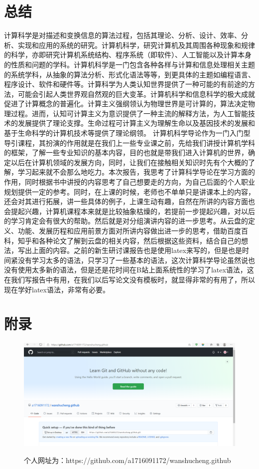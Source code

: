 \documentclass{article}
\begin{document}
\section{总结}
计算科学是对描述和变换信息的算法过程，包括其理论、分析、设计、效率、分析、实现和应用的系统的研究。计算机科学，研究计算机及其周围各种现象和规律的科学，亦即研究计算机系统结构、程序系统（即软件）、人工智能以及计算本身的性质和问题的学科。计算机科学是一门包含各种各样与计算和信息处理相关主题的系统学科，从抽象的算法分析、形式化语法等等，到更具体的主题如编程语言、程序设计、软件和硬件等。计算科学为人类认知世界提供了一种可能的有前途的方法，可能会引起人类世界观自然观的巨大变革。计算机科学和信息科学的极大成就促进了计算概念的普遍化。计算主义强纲领认为物理世界是可计算的，算法决定物理过程。进而，认知可计算主义为意识提供了一种主流的解释方法，为人工智能技术的发展提供了理论支撑。生命过程可计算主义为理解生命以及基因技术的发展和基于生命科学的计算机技术等提供了理论纲领。
计算机科学导论作为一门入门型导引课程，其扮演的作用就是在我们上一些专业课之前，先给我们讲授计算机学科的框架，了解一些专业知识的基本内容，目的也就是带我们进入计算机的世界，确定以后在计算机领域的发展方向，同时，让我们在接触相关知识时先有个大概的了解，学习起来就不会那么地吃力。本次报告，我思考了计算科学导论在学习方面的作用，同时根据书中讲授的内容思考了自己想要走的方向，为自己后面的个人职业规划提供一定的参考。同时，在上课的时候，老师也不单单只是讲课本上的内容，还会对其进行拓展，讲一些具体的例子，上课生动有趣，自然在所讲的内容方面也会提起兴趣，计算机课程本来就是比较抽象枯燥的，若提前一步提起兴趣，对以后的学习肯定会有很大的帮助。然后就是对分组演讲内容的进一步思考。从云盘的定义、功能、发展历程和应用前景方面对所讲内容做出进一步的思考，借助百度百科，知乎和各种论文了解到云盘的相关内容，然后根据这些资料，结合自己的想法，写出上面的内容。之前的新生研讨课报告也是使用latex来写的，但是也是时间紧没有学习太多的语法，只学习了一些基本的语法，这次计算科学导论虽然说也没有使用太多新的语法，但是还是花时间在B站上面系统性的学习了latex语法，这在我们写报告中有用，在我们以后写论文没有模板时，就显得非常的有用了，所以现在学好latex语法，非常有必要。

\section{附录}
    \begin{figure}[H]
    	\centering
    	\includegraphics[width=0.7\linewidth]{Github}
    	\caption{}
    	\label{fig:github}
    	个人网址为：https://github.com/a1716091172/wanshucheng.github
    \end{figure}
	
\end{document}
